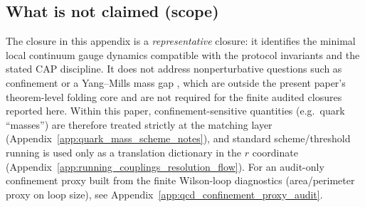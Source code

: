 \subsection{What is not claimed (scope)}
\label{subsec:op3_not_claimed_scope}

The closure in this appendix is a \emph{representative} closure: it identifies the minimal local continuum gauge dynamics compatible with the protocol invariants and the stated CAP discipline.
It does not address nonperturbative questions such as confinement or a Yang--Mills mass gap \cite{JaffeWitten2000YangMillsMassGap,Greensite2011Confinement}, which are outside the present paper's theorem-level folding core and are not required for the finite audited closures reported here.
Within this paper, confinement-sensitive quantities (e.g.\ quark ``masses'') are therefore treated strictly at the matching layer (Appendix~\ref{app:quark_mass_scheme_notes}), and standard scheme/threshold running is used only as a translation dictionary in the $r$ coordinate (Appendix~\ref{app:running_couplings_resolution_flow}).
\AuditTag For an audit-only confinement proxy built from the finite Wilson-loop diagnostics (area/perimeter proxy on loop size), see Appendix~\ref{app:qcd_confinement_proxy_audit}.

